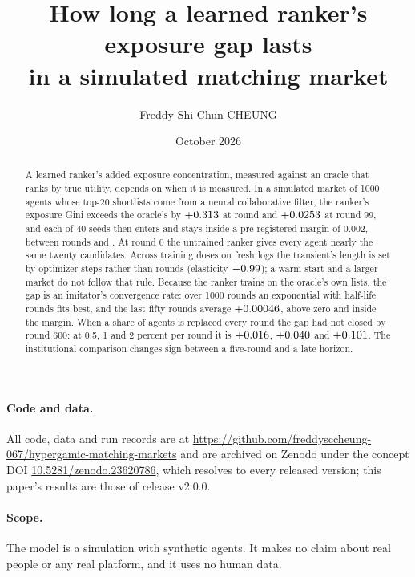 \documentclass[11pt]{article}
\title{How long a learned ranker's exposure gap lasts\\
       in a simulated matching market}
\author{Freddy Shi Chun CHEUNG}
\date{October 2026}
\begin{document}
\maketitle

\begin{abstract}
\noindent
A learned ranker's added exposure concentration, measured against an oracle that
ranks by true utility, depends on when it is measured. In a simulated market of
1000 agents whose top-20 shortlists come from a neural collaborative filter, the
ranker's exposure Gini exceeds the oracle's by $+0.313$ at round \peakRound{}
and $+0.0253$ at round 99, and each of 40 seeds then enters and stays
inside a pre-registered margin of 0.002, between rounds \entryMinAll{} and
\entryMaxAll{}. At round 0 the untrained ranker gives every agent nearly the same
twenty candidates. Across training doses on fresh logs the transient's length is
set by optimizer steps rather than rounds (elasticity $-0.99$); a warm
start and a larger market do not follow that rule. Because the ranker trains on
the oracle's own lists, the gap is an imitator's convergence rate: over 1000
rounds an exponential with half-life \halfLife{} rounds fits best, and the last
fifty rounds average $+0.00046$, above zero and inside the margin. When a share
of agents is replaced every round the gap had not closed by round 600: at 0.5, 1
and 2 percent per round it is $+0.016$, $+0.040$ and $+0.101$.
The institutional comparison changes sign between a five-round and a late
horizon.
\end{abstract}

\paragraph{Code and data.}
All code, data and run records are at
\url{https://github.com/freddysccheung-067/hypergamic-matching-markets} and are
archived on Zenodo under the concept DOI
\href{https://doi.org/10.5281/zenodo.23620786}{10.5281/zenodo.23620786}, which
resolves to every released version; this paper's results are those of release
v2.0.0.

\paragraph{Scope.}
The model is a simulation with synthetic agents. It makes no claim about real
people or any real platform, and it uses no human data.












\appendix



\end{document}
